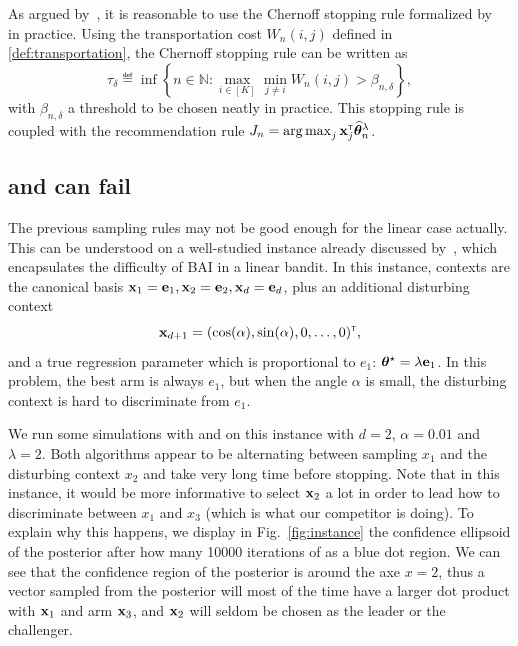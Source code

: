 As argued by~\cite{shang2020t3c}, it is reasonable to use the Chernoff stopping rule formalized by~\cite{garivier2016tracknstop} in practice. Using the transportation cost $W_n(i,j)$ defined in \eqref{def:transportation}, the Chernoff stopping rule can be written as
\begin{equation}\label{eq:chernoffstoppingtime}
\tau_\delta \eqdef \inf \left\lbrace n \in \mathbb{N} : \max_{i \in [K]} \min_{j \neq i } W_{n}(i,j) > \beta_{n,\delta} \right\rbrace,
\end{equation}
with $\beta_{n,\delta}$ a threshold to be chosen neatly in practice. This stopping rule is coupled with the recommendation rule $J_n = \operatorname*{arg\,max}_{j}{\bf x}_j^\mathsf{\scriptscriptstyle T}\widehat{{\boldsymbol \theta}}_n^{\lambda}$. 

\subsection{\TTTS{} and \TCC{} can fail}

The previous sampling rules may not be good enough for the linear case actually. This can be understood on a well-studied instance already discussed by~\cite{soare2014linear,xu2018linear}, which encapsulates the difficulty of BAI in a linear bandit. In this instance, contexts are the canonical basis  ${\bf x}_1 = {\bf e}_1, {\bf x}_2 = {\bf e}_2, {\bf x}_d = {\bf e}_d$, plus an additional disturbing context \[{\bf x}_{d+1} = (\cos(\alpha), \sin(\alpha), 0, \ldots, 0)^\mathsf{\scriptscriptstyle T},\] and a true regression parameter which is proportional to $e_1$: ${\boldsymbol \theta}^\star = \lambda{\bf e}_1$. In this problem, the best arm is always $e_1$, but when the angle $\alpha$ is small, the disturbing context is hard to discriminate from $e_1$. 

We run some simulations with \TTTS{} and \TCC{} on this instance with $d=2$, $\alpha=0.01$ and $\lambda=2$. Both algorithms appear to be alternating between sampling $x_1$ and the disturbing context $x_2$ and take very long time before stopping. Note that in this instance, it would be more informative to select ${\bf x}_2$ a lot in order to lead how to discriminate between $x_1$ and $x_3$ (which is what our competitor \LGapE{} is doing). To explain why this happens, we display in Fig.~\ref{fig:instance} the confidence ellipsoid of the posterior after how many 10000 iterations of \TCC{} as a blue dot region. We can see that the confidence region of the posterior is around the axe $x=2$, thus a vector sampled from the posterior will most of the time have a larger dot product with ${\bf x}_1$ and arm ${\bf x}_3$, and ${\bf x}_2$ will seldom be chosen as the leader or the challenger. 

